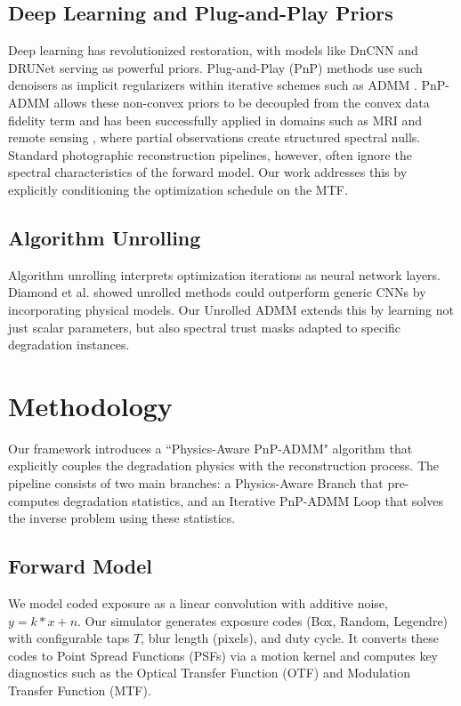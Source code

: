 \documentclass[10pt,journal,compsoc]{IEEEtran}
\begin{document}
\subsection{Deep Learning and Plug-and-Play Priors}
Deep learning has revolutionized restoration, with models like DnCNN \cite{zhang2017beyond} and DRUNet \cite{zhang2021plug} serving as powerful priors. Plug-and-Play (PnP) methods \cite{venkatakrishnan2013plug,chan2016plug} use such denoisers as implicit regularizers within iterative schemes such as ADMM \cite{boyd2011distributed}. PnP-ADMM allows these non-convex priors to be decoupled from the convex data fidelity term and has been successfully applied in domains such as MRI and remote sensing \cite{venkatakrishnan2013plug,chan2016plug}, where partial observations create structured spectral nulls. Standard photographic reconstruction pipelines, however, often ignore the spectral characteristics of the forward model. Our work addresses this by explicitly conditioning the optimization schedule on the MTF.

\subsection{Algorithm Unrolling}
Algorithm unrolling \cite{monga2021algorithm} interprets optimization iterations as neural network layers. Diamond et al. \cite{diamond2017unrolled} showed unrolled methods could outperform generic CNNs by incorporating physical models. Our Unrolled ADMM extends this by learning not just scalar parameters, but also spectral trust masks adapted to specific degradation instances.

\section{Methodology}
Our framework introduces a ``Physics-Aware PnP-ADMM" algorithm that explicitly couples the degradation physics with the reconstruction process. The pipeline consists of two main branches: a Physics-Aware Branch that pre-computes degradation statistics, and an Iterative PnP-ADMM Loop that solves the inverse problem using these statistics.

\subsection{Forward Model}
We model coded exposure as a linear convolution with additive noise, $y = k * x + n$. Our simulator generates exposure codes (Box, Random, Legendre) with configurable taps $T$, blur length (pixels), and duty cycle. It converts these codes to Point Spread Functions (PSFs) via a motion kernel and computes key diagnostics such as the Optical Transfer Function (OTF) and Modulation Transfer Function (MTF).
\end{document}
